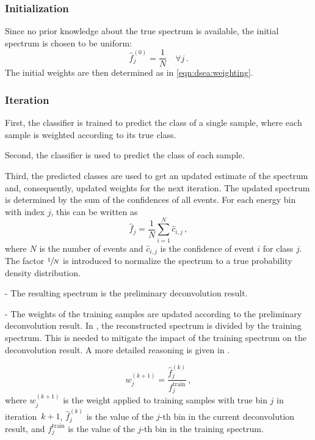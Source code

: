 \subsubsection{Initialization}
Since no prior knowledge about the true spectrum is available,
  the initial spectrum is chosen to be uniform:
\begin{equation}
  \hat f_j^{(0)} = \frac{1}{N} \quad \forall j \, .
\end{equation}
The initial weights are then determined as in \autoref{eqn:dsea:weighting}.


\subsubsection{Iteration}
First,
the classifier is trained to predict the class of a single sample,
where each sample is weighted according to its true class.

Second,
the classifier is used to predict the class of each sample.

Third,
the predicted classes are used to
  get an updated estimate of the spectrum
  and,
    consequently,
  updated weights for the next iteration.
%
The updated spectrum is determined by the sum of the confidences of all events.
For each energy bin with index $j$,
this can be written as
\begin{equation}
  \hat f_j = \frac{1}{N} \sum_{i=1}^N \hat c_{i,j} \, ,
\end{equation}
where $N$ is the number of events
and $\hat c_{i,j}$ is the confidence of event $i$ for class $j$.
The factor $\sfrac{1}{N}$ is introduced to normalize the spectrum
to a true probability density distribution.

- The resulting spectrum is the preliminary deconvolution result.

- The weights of the training samples are updated according to the preliminary deconvolution result.
In \dseaplus{}, the reconstructed spectrum is divided by the training spectrum. %
This is needed to mitigate the impact of the training spectrum on the deconvolution result.
A more detailed reasoning is given in \cite{dsea_mirko}.

\begin{equation}
  \label{eqn:dsea:weighting}
  w_j^{(k+1)} = \frac{\hat f_j^{(k)}}{f_j^\text{train}} \, ,
\end{equation}
where $w_j^{(k+1)}$ is the weight applied to training samples with true bin $j$ in iteration~$k+1$,
$\hat f_j^{(k)}$ is
  the value of the $j$-th bin in
  the current deconvolution result, %
and $f_j^\text{train}$ is
  the value of the $j$-th bin in
  the training spectrum.


